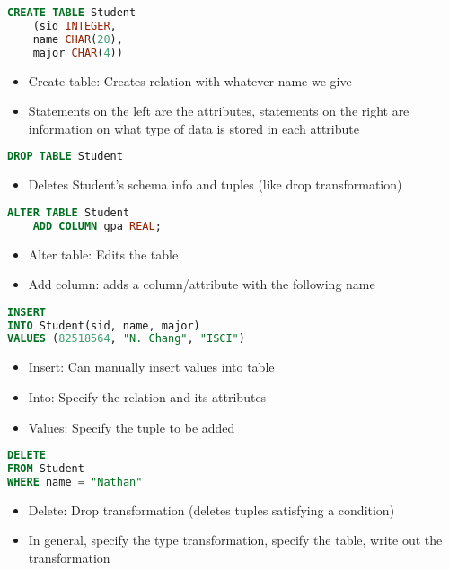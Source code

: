\documentclass[8pt,landscape,a4paper, fleqn, dvipsnames]{extarticle}
\begin{document}
\begin{multicols*}{4}
\begin{lstlisting}[language = SQL]
CREATE TABLE Student
    (sid INTEGER,
    name CHAR(20),
    major CHAR(4))
\end{lstlisting}
\begin{itemize}
    \item Create table: Creates relation with whatever name we give
    \item Statements on the left are the attributes, statements on the right are information on what type of data is stored in each attribute
\end{itemize}
\begin{lstlisting}[language = SQL]
DROP TABLE Student
\end{lstlisting}
\begin{itemize}
    \item Deletes Student's schema info and tuples (like drop transformation)
\end{itemize}
\begin{lstlisting}[language = SQL]
ALTER TABLE Student
    ADD COLUMN gpa REAL;
\end{lstlisting}
\begin{itemize}
    \item Alter table: Edits the table
    \item Add column: adds a column/attribute with the following name
\end{itemize}
\begin{lstlisting}[language = SQL]
INSERT
INTO Student(sid, name, major)
VALUES (82518564, "N. Chang", "ISCI")
\end{lstlisting}
\begin{itemize}
    \item Insert: Can manually insert values into table
    \item Into: Specify the relation and its attributes
    \item Values: Specify the tuple to be added
\end{itemize}
\begin{lstlisting}[language = SQL]
DELETE
FROM Student
WHERE name = "Nathan"
\end{lstlisting}
\begin{itemize}
    \item Delete: Drop transformation (deletes tuples satisfying a condition)
\end{itemize}
\begin{itemize}
    \item In general, specify the type transformation, specify the table, write out the transformation

\end{itemize}
\end{multicols*}
\end{document}
